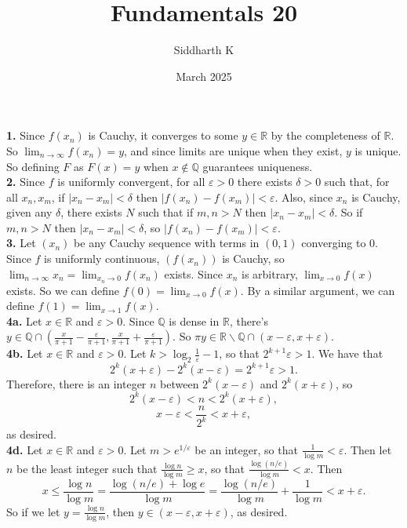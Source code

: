 \documentclass{article}
\title{Fundamentals 20}
\author{Siddharth K}
\date{March 2025}
\newcommand{\R}{\mathbb{R}}
\newcommand{\Q}{\mathbb{Q}}
\newcommand{\eps}{\varepsilon}
\newcommand{\lb}{\left(}
\newcommand{\rb}{\right)}
\begin{document}
\maketitle

\textbf{1.} Since $f(x_n)$ is Cauchy, it converges to some $y \in \R$ by the completeness of $\R$. So $\lim_{n\to \infty} f(x_n) = y$, and since limits are unique when they exist, $y$ is unique. So defining $F$ as $F(x) = y$ when $x \not \in \Q$ guarantees uniqueness. \\

\textbf{2.} Since $f$ is uniformly convergent, for all $\eps > 0$ there exists $\delta > 0$ such that, for all $x_n, x_m$, if $|x_n - x_m| < \delta$ then $|f(x_n) - f(x_m)| < \eps$. Also, since $x_n$ is Cauchy, given any $\delta$, there exists $N$ such that if $m, n > N$ then $|x_n - x_m| < \delta$. So if $m, n > N$ then $|x_n - x_m| < \delta$, so $|f(x_n) - f(x_m)| < \eps$. \\

\textbf{3.} Let $(x_n)$ be any Cauchy sequence with terms in $(0, 1)$ converging to $0$. Since $f$ is uniformly continuous, $(f(x_n))$ is Cauchy, so $\lim_{n\to\infty} x_n = \lim_{x_n \to 0} f(x_n)$ exists. Since $x_n$ is arbitrary, $\lim_{x\to 0} f(x)$ exists. So we can define $f(0) = \lim_{x\to 0} f(x)$. By a similar argument, we can define $f(1) = \lim_{x\to 1} f(x)$. \\

\textbf{4a.} Let $x \in \R$ and $\eps > 0$. Since $\Q$ is dense in $\R$, there's $y \in \Q \cap \lb \frac{x}{\pi + 1} - \frac{\eps}{\pi + 1}, \frac{x}{\pi + 1} + \frac{\eps}{\pi + 1} \rb$. So $\pi y \in \R \backslash \Q \cap (x - \eps, x + \eps)$. \\

\textbf{4b.} Let $x \in \R$ and $\eps > 0$. Let $k > \log_2 \frac{1}{\eps} - 1$, so that $2^{k + 1}\eps > 1$. We have that
$$2^k(x + \eps) - 2^k(x -  \eps) = 2^{k + 1}\eps > 1.$$
Therefore, there is an integer $n$ between $2^k(x - \eps)$ and $2^k(x + \eps)$, so
$$2^k(x - \eps) < n < 2^k(x + \eps),$$
$$x - \eps < \frac{n}{2^k} < x + \eps,$$
as desired. \\

\textbf{4d.} Let $x \in \R$ and $\eps > 0$. Let $m > e^{1/\eps}$ be an integer, so that $\frac{1}{\log m} < \eps$. Then let $n$ be the least integer such that $\frac{\log n}{\log m} \ge x$, so that $\frac{\log (n/e)}{\log m} < x$. Then
$$x \le \frac{\log n}{\log m} = \frac{\log (n/e) + \log e}{\log m} = \frac{\log (n/e)}{\log m} + \frac{1}{\log m} < x + \eps.$$
So if we let $y = \frac{\log n}{\log m}$, then $y \in (x - \eps, x + \eps)$, as desired. \\
\end{document}
